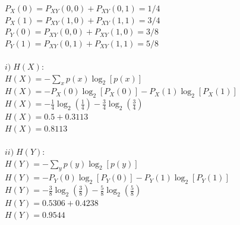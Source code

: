 \documentclass[a4paper]{article}
\begin{document}
$ P_X(0) = P_{XY}(0,0) + P_{XY}(0,1) = 1/4     $\\
$ P_X(1) = P_{XY}(1,0) + P_{XY}(1,1) = 3/4     $\\
$ P_Y(0) = P_{XY}(0,0) + P_{XY}(1,0) = 3/8     $\\
$ P_Y(1) = P_{XY}(0,1) + P_{XY}(1,1) = 5/8     $\\

\paragraph{$ i) \; H(X):                                    $
\\
$ \displaystyle H(X) = -\sum_{x} p(x) \log_2 [p(x)]         $\\
$ H(X) = -P_X(0) \log_2 [P_X(0)] -P_X(1) \log_2 [P_X(1)]    $\\
$ \displaystyle 
    H(X) = - \frac{1}{4} \log_2 \left( \frac{1}{4} \right) 
           - \frac{3}{4} \log_2 \left( \frac{3}{4} \right)  $\\
$ H(X) = 0.5 + 0.3113                                       $\\
$ \boxed{ H(X) = 0.8113 }                                   $\\
}
\paragraph{$ ii) \; H(Y):                                   $
\\
$ \displaystyle H(Y) = -\sum_{y} p(y) \log_2 [p(y)]         $\\
$ H(Y) = -P_Y(0) \log_2 [P_Y(0)] -P_Y(1) \log_2 [P_Y(1)]    $\\
$ \displaystyle 
    H(Y) = - \frac{3}{8} \log_2 \left( \frac{3}{8} \right) 
           - \frac{5}{8} \log_2 \left( \frac{5}{8} \right)  $\\
$ H(Y) = 0.5306 + 0.4238                                    $\\
$ \boxed{ H(Y) = 0.9544 }                                   $\\
}
\end{document}
